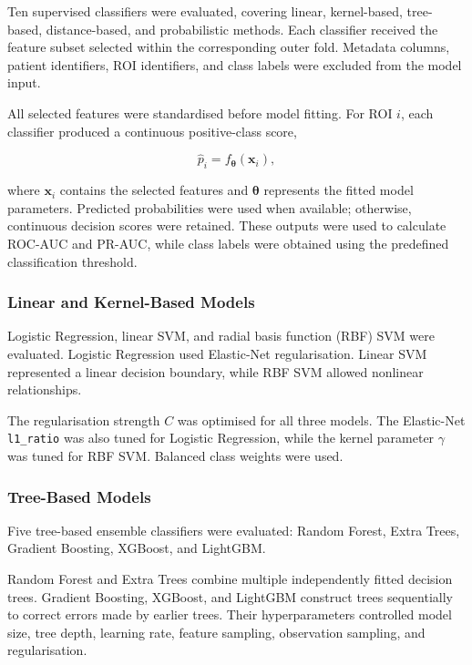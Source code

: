 \documentclass[12pt,twocolumn]{article}
\begin{document}
Ten supervised classifiers were evaluated, covering linear,
kernel-based, tree-based, distance-based, and probabilistic methods.
Each classifier received the feature subset selected within the
corresponding outer fold. Metadata columns, patient identifiers, ROI
identifiers, and class labels were excluded from the model input.

All selected features were standardised before model fitting. For ROI
\(i\), each classifier produced a continuous positive-class score,

\begin{equation}
\widehat{p}_i =
f_{\boldsymbol{\theta}}(\mathbf{x}_i),
\label{eq:classifier_output}
\end{equation}

where \(\mathbf{x}_i\) contains the selected features and
\(\boldsymbol{\theta}\) represents the fitted model parameters.
Predicted probabilities were used when available; otherwise,
continuous decision scores were retained. These outputs were used to
calculate ROC-AUC and PR-AUC, while class labels were obtained using
the predefined classification threshold.

\subsubsection{Linear and Kernel-Based Models}
\label{subsubsec:linear_kernel_classifiers}

Logistic Regression, linear SVM, and radial basis function (RBF) SVM
were evaluated. Logistic Regression used Elastic-Net regularisation.
Linear SVM represented a linear decision boundary, while RBF SVM
allowed nonlinear relationships.

The regularisation strength \(C\) was optimised for all three models.
The Elastic-Net \texttt{l1\_ratio} was also tuned for Logistic
Regression, while the kernel parameter \(\gamma\) was tuned for RBF
SVM. Balanced class weights were used.

\subsubsection{Tree-Based Models}
\label{subsubsec:tree_classifiers}

Five tree-based ensemble classifiers were evaluated: Random Forest,
Extra Trees, Gradient Boosting, XGBoost, and LightGBM.

Random Forest and Extra Trees combine multiple independently fitted
decision trees. Gradient Boosting, XGBoost, and LightGBM construct
trees sequentially to correct errors made by earlier trees. Their
hyperparameters controlled model size, tree depth, learning rate,
feature sampling, observation sampling, and regularisation.
\end{document}
